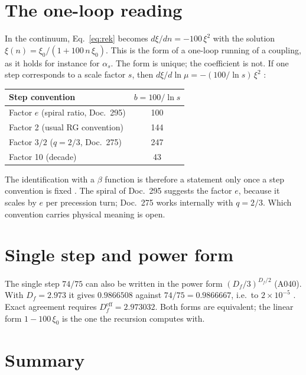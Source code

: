 \section{The one-loop reading}

In the continuum, Eq.~\eqref{eq:rek} becomes $d\xi/dn=-100\,\xi^2$ with the solution
$\xi(n)=\xi_0/(1+100\,n\,\xi_0)$. This is the form of a one-loop running of a
coupling, as it holds for instance for $\alpha_s$. The form is unique; the
coefficient is not. If one step corresponds to a scale factor $s$, then
$d\xi/d\ln\mu=-(100/\ln s)\,\xi^2$ \KM:

\begin{center}
\begin{tabular}{lc}
\toprule
Step convention & $b=100/\ln s$ \\
\midrule
Factor $e$ (spiral ratio, Doc.~295) & 100 \\
Factor 2 (usual RG convention) & 144 \\
Factor $3/2$ ($q=2/3$, Doc.~275) & 247 \\
Factor 10 (decade) & 43 \\
\bottomrule
\end{tabular}
\end{center}

The identification with a $\beta$ function is therefore a statement only once a
step convention is fixed \SM. The spiral of Doc.~295 suggests the factor $e$,
because it scales by $e$ per precession turn; Doc.~275 works internally with
$q=2/3$. Which convention carries physical meaning is open.

\section{Single step and power form}

The single step $74/75$ can also be written in the power form $(D_f/3)^{D_f/2}$
(A040). With $D_f=2.973$ it gives $0.9866508$ against $74/75=0.9866667$, i.e.\ to
$2\times10^{-5}$ \KM. Exact agreement requires $D_f^\text{eff}=2.973032$. Both forms
are equivalent; the linear form $1-100\,\xi_0$ is the one the recursion computes
with.

\section{Summary}


